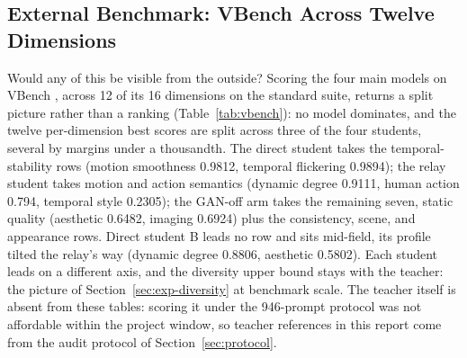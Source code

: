 \documentclass[11pt,a4paper]{article}
\begin{document}
\subsection{External Benchmark: VBench Across Twelve Dimensions}\label{sec:exp-vbench}

Would any of this be visible from the outside? Scoring the four main models on VBench \cite{vbench}, across 12 of its 16 dimensions on the standard suite, returns a split picture rather than a ranking (Table~\ref{tab:vbench}): no model dominates, and the twelve per-dimension best scores are split across three of the four students, several by margins under a thousandth. The direct student takes the temporal-stability rows (motion smoothness 0.9812, temporal flickering 0.9894); the relay student takes motion and action semantics (dynamic degree 0.9111, human action 0.794, temporal style 0.2305); the GAN-off arm takes the remaining seven, static quality (aesthetic 0.6482, imaging 0.6924) plus the consistency, scene, and appearance rows. Direct student B leads no row and sits mid-field, its profile tilted the relay's way (dynamic degree 0.8806, aesthetic 0.5802). Each student leads on a different axis, and the diversity upper bound stays with the teacher: the picture of Section~\ref{sec:exp-diversity} at benchmark scale. The teacher itself is absent from these tables: scoring it under the 946-prompt protocol was not affordable within the project window, so teacher references in this report come from the audit protocol of Section~\ref{sec:protocol}.
\end{document}
